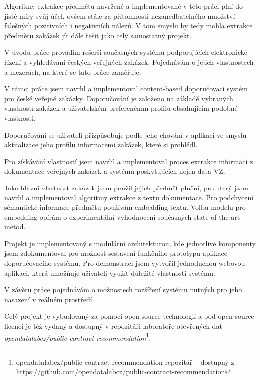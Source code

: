 \documentclass[thesis=M,czech]{FITthesis}[2019/12/23]
\begin{document}
Algoritmy extrakce předmětu navržené a implementované v této práci plní do jisté míry svůj účel, ovšem stále za přítomnosti nezanedbatelného množství falešných pozitivních i negativních nálezů. V tom smyslu by tedy mohla extrakce předmětu zakázek jít dále řešit jako celý samostatný projekt.


\begin{conclusion}
	V úvodu práce provádím rešerši současných systémů podporujících elektronické řízení a vyhledávání českých veřejných zakázek. Pojednávám o jejich vlastnostech a mezerách, na které se tato práce zaměřuje.
	
	V rámci práce jsem navrhl a implementoval content-based doporučovací systém pro české veřejné zakázky. Doporučování je založeno na základě vybraných vlastností zakázek a uživatelském preferenčním profilu obsahujícím podobné vlastnosti.
	
	Doporučování se uživateli přizpůsobuje podle jeho chování v aplikaci ve smyslu aktualizace jeho profilu informacemi zakázek, které si prohlédl.
	
	Pro získávání vlastností jsem navrhl a implementoval proces extrakce informací z dokumentace veřejných zakázek a systémů poskytujících nejen data VZ.
	
	Jako hlavní vlastnost zakázek jsem použil jejich předmět plnění, pro který jsem navrhl a implementoval algoritmy extrakce z textu dokumentace. Pro podchycení sémantické informace předmětu používám embedding textu. Volbu modelu pro embedding opírám o experimentální vyhodnocení současných state-of-the-art metod.
	
	Projekt je implementovaný s modulární architekturou, kde jednotlivé komponenty jsem zdokumentoval pro možnost sestavení funkčního prototypu aplikace doporučovacího systému. Pro demonstraci jsem vytvořil jednoduchou webovou aplikaci, která umožňuje uživateli využít důležité vlastnosti systému.
	
	V závěru práce pojednávám o možnostech rozšíření systému nutných pro jeho nasazení v reálném prostředí.
	
	Celý projekt je vybudovaný za pomocí open-source technologií a pod open-source licencí je též vydaný a dostupný v repozitáři laboratoře otevřených dat  \textit{opendatalabcz/public-contract-recommendation}\footnote{opendatalabcz/public-contract-recommendation repozitář\newline
	-- dostupný z https://github.com/opendatalabcz/public-contract-recommendation}.
\end{conclusion}
\end{document}
